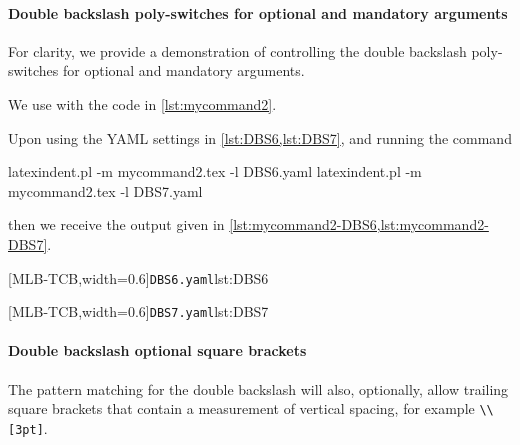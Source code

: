  \paragraph{Double backslash poly-switches for optional and mandatory arguments}
  For clarity, we provide a demonstration of controlling the double backslash
  poly-switches for optional and mandatory arguments.

  \begin{example}
  We use with the code in \cref{lst:mycommand2}. 


  Upon using the YAML settings in \cref{lst:DBS6,lst:DBS7}, and running the command
   

  \begin{commandshell}
latexindent.pl -m mycommand2.tex -l DBS6.yaml
latexindent.pl -m mycommand2.tex -l DBS7.yaml
\end{commandshell}

  then we receive the output given in \cref{lst:mycommand2-DBS6,lst:mycommand2-DBS7}.

  \begin{cmhtcbraster}[
    raster force size=false,
    raster column 1/.style={add to width=-.1\textwidth},
    raster column skip=.03\linewidth]
   [MLB-TCB,width=0.6\textwidth]{\texttt{DBS6.yaml}}{lst:DBS6}
  \end{cmhtcbraster}

  \begin{cmhtcbraster}[
    raster force size=false,
    raster column 1/.style={add to width=-.1\textwidth},
    raster column skip=.03\linewidth]
   [MLB-TCB,width=0.6\textwidth]{\texttt{DBS7.yaml}}{lst:DBS7}
  \end{cmhtcbraster}
  \end{example}

 \paragraph{Double backslash optional square brackets}
  The pattern matching for the double backslash will also, optionally, allow trailing
  square brackets that contain a measurement of vertical spacing, for example
  \lstinline!\\[3pt]!. 

